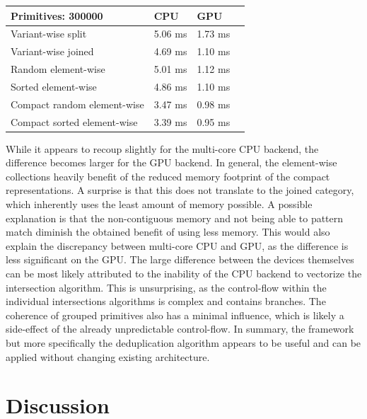 \documentclass{article}
\begin{document}
\begin{center}
    \begin{tabular}{ | m{14em} | m{8em}| m{8em} | m{8em} | } 
      \hline
      {\bf Primitives: 300000} & {\bf CPU} & {\bf GPU} \\ 
      \hline
      Variant-wise split          & 5.06 ms & 1.73 ms\\ 
      \hline
      Variant-wise joined         & 4.69 ms & 1.10 ms\\ 
      \hline
      Random element-wise         & 5.01 ms & 1.12 ms\\ 
      \hline
      Sorted element-wise         & 4.86 ms & 1.10 ms\\ 
      \hline
      Compact random element-wise & 3.47 ms & 0.98 ms\\ 
      \hline
      Compact sorted element-wise & 3.39 ms & 0.95 ms\\ 
      \hline
    \end{tabular}
\end{center}

While it appears to recoup slightly for the multi-core CPU backend, the difference becomes larger for the GPU backend.
In general, the element-wise collections heavily benefit of the reduced memory footprint of the compact representations.
A surprise is that this does not translate to the joined category, which inherently uses the least amount of memory possible.
A possible explanation is that the non-contiguous memory and not being able to pattern match diminish the obtained benefit of using less memory.
This would also explain the discrepancy between multi-core CPU and GPU, as the difference is less significant on the GPU.
The large difference between the devices themselves can be most likely attributed to the inability of the CPU backend to vectorize the intersection algorithm.
This is unsurprising, as the control-flow within the individual intersections algorithms is complex and contains branches.  
The coherence of grouped primitives also has a minimal influence, which is likely a side-effect of the already unpredictable control-flow.
In summary, the framework but more specifically the deduplication algorithm appears to be useful and can be applied without changing existing architecture.

\newpage

\section{Discussion}
\end{document}
